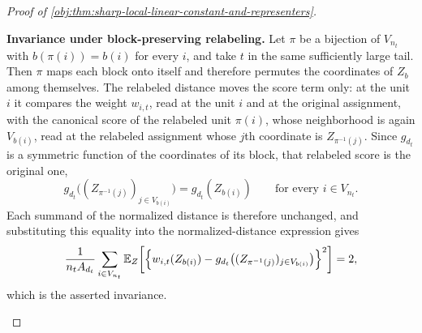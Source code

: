 \begin{proof}[Proof of \cref{obj:thm:sharp-local-linear-constant-and-representers}]
\begin{enumerate}
\textbf{Invariance under block-preserving relabeling.}  Let \(\pi\) be a bijection of \(V_{n_t}\) with \(b(\pi(i))=b(i)\) for every \(i\), and take \(t\) in the same sufficiently large tail.  Then \(\pi\) maps each block onto itself and therefore permutes the coordinates of \(Z_b\) among themselves.  The relabeled distance moves the score term only: at the unit \(i\) it compares the weight \(w_{i,t}\), read at the unit \(i\) and at the original assignment, with the canonical score of the relabeled unit \(\pi(i)\), whose neighborhood is again \(V_{b(i)}\), read at the relabeled assignment whose \(j\)th coordinate is \(Z_{\pi^{-1}(j)}\).  Since \(g_{d_t}\) is a symmetric function of the coordinates of its block, that relabeled score is the original one,
\[
g_{d_t}\bigl((Z_{\pi^{-1}(j)})_{j\in V_{b(i)}}\bigr)
=
g_{d_t}(Z_{b(i)})
\qquad\text{for every }i\in V_{n_t}.
\]
Each summand of the normalized distance is therefore unchanged, and substituting this equality into the normalized-distance expression gives
\[
\frac{1}{n_tA_{d_t}}
\sum_{i\in V_{n_t}}
\mathbb E_Z\!\left[
\Bigl\{w_{i,t}(Z_{b(i)})-g_{d_t}\bigl((Z_{\pi^{-1}(j)})_{j\in V_{b(i)}}\bigr)\Bigr\}^2
\right]
=2 ,
\]
which is the asserted invariance.
\end{enumerate}
\end{proof}

